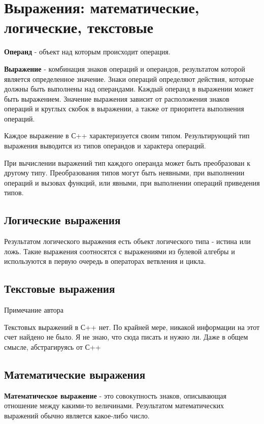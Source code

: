 \section{Выражения: математические, логические,
текстовые}\label{ux432ux44bux440ux430ux436ux435ux43dux438ux44f-ux43cux430ux442ux435ux43cux430ux442ux438ux447ux435ux441ux43aux438ux435-ux43bux43eux433ux438ux447ux435ux441ux43aux438ux435-ux442ux435ux43aux441ux442ux43eux432ux44bux435}

\textbf{Операнд} - объект над которым происходит операция.

\textbf{Выражение} - комбинация знаков операций и операндов, результатом
которой является определенное значение. Знаки операций определяют
действия, которые должны быть выполнены над операндами. Каждый операнд в
выражении может быть выражением. Значение выражения зависит от
расположения знаков операций и круглых скобок в выражении, а также от
приоритета выполнения операций.

Каждое выражение в С++ характеризуется своим типом. Результирующий тип
выражения выводится из типов операндов и характера операций.

При вычислении выражений тип каждого операнда может быть преобразован к
другому типу. Преобразования типов могут быть неявными, при выполнении
операций и вызовах функций, или явными, при выполнении операций
приведения типов.

\subsection{Логические
выражения}\label{ux43bux43eux433ux438ux447ux435ux441ux43aux438ux435-ux432ux44bux440ux430ux436ux435ux43dux438ux44f}

Результатом логического выражения есть объект логического типа - истина
или ложь. Такие выражения соотносятся с выражениями из булевой алгебры и
используются в первую очередь в операторах ветвления и цикла.

\subsection{Текстовые
выражения}\label{ux442ux435ux43aux441ux442ux43eux432ux44bux435-ux432ux44bux440ux430ux436ux435ux43dux438ux44f}

Примечание автора

Текстовых выражений в С++ нет. По крайней мере, никакой информации на
этот счет найдено не было. Я не знаю, что сюда писать и нужно ли. Даже в
общем смысле, абстрагируясь от С++

\subsection{Математические
выражения}\label{ux43cux430ux442ux435ux43cux430ux442ux438ux447ux435ux441ux43aux438ux435-ux432ux44bux440ux430ux436ux435ux43dux438ux44f}

\textbf{Математическое выражение} - это совокупность знаков, описывающая
отношение между какими-то величинами. Результатом математических
выражений обычно является какое-либо число.
